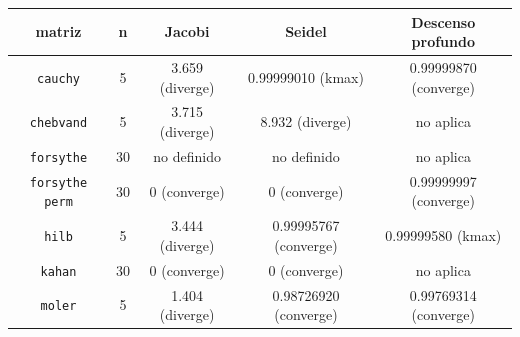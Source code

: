 {\scriptsize
\begin{tabular}{ccccc}
\toprule
\rowcolor{Azul1!50}
matriz & n & Jacobi & Seidel & Descenso profundo \\
\midrule
\texttt{cauchy} & 5 & 3.659 (diverge) & 0.99999010 (kmax) & 0.99999870 (converge) \\
\texttt{chebvand} & 5 & 3.715 (diverge) & 8.932 (diverge) & no aplica \\
\texttt{forsythe} & 30 & no definido & no definido & no aplica \\
\texttt{forsythe perm} & 30 & 0 (converge) & 0 (converge) & 0.99999997 (converge) \\
\texttt{hilb} & 5 & 3.444 (diverge) & 0.99995767 (converge) & 0.99999580 (kmax) \\
\texttt{kahan} & 30 & 0 (converge) & 0 (converge) & no aplica \\
\texttt{moler} & 5 & 1.404 (diverge) & 0.98726920 (converge) & 0.99769314 (converge) \\
\bottomrule
\end{tabular}}
